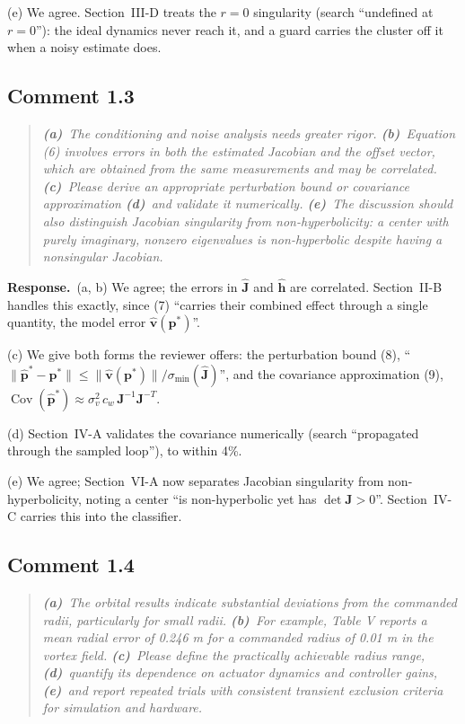 \documentclass[10pt]{article}
\newcommand{\rev}[1]{#1}                             %
\newcommand{\resp}{\par\textbf{Response.}~}
\begin{document}
(e) We agree. Section~III-D treats the $r = 0$ singularity (search ``undefined at $r = 0$''): the ideal dynamics never reach it, and a guard carries the cluster off it when a noisy estimate does.

\subsection*{Comment 1.3}

\begin{quote}\itshape
\textbf{(a)}~The conditioning and noise analysis needs greater rigor.
\textbf{(b)}~Equation (6) involves errors in both the estimated Jacobian and the offset vector, which are obtained from the same measurements and may be correlated.
\textbf{(c)}~Please derive an appropriate perturbation bound or covariance approximation
\textbf{(d)}~and validate it numerically.
\textbf{(e)}~The discussion should also distinguish Jacobian singularity from non-hyperbolicity: a center with purely imaginary, nonzero eigenvalues is non-hyperbolic despite having a nonsingular Jacobian.
\end{quote}

\resp (a, b) We agree; the errors in $\hat{\mathbf{J}}$ and $\hat{\mathbf{h}}$ are correlated. Section~II-B handles this exactly, since (7) ``carries their combined effect through a single quantity, the model error $\hat{\mathbf{v}}(\mathbf{p}^*)$''.

(c) We give both forms the reviewer offers: the perturbation bound (8), ``$\|\hat{\mathbf{p}}^* - \mathbf{p}^*\| \le \|\hat{\mathbf{v}}(\mathbf{p}^*)\|/\sigma_{\min}(\hat{\mathbf{J}})$'', and the covariance approximation (9), $\operatorname{Cov}(\hat{\mathbf{p}}^*) \approx \sigma_v^2\, c_w\, \mathbf{J}^{-1}\mathbf{J}^{-T}$.

(d) Section~IV-A validates the covariance numerically (search ``propagated through the sampled loop''), to within \rev{4}\%.

(e) We agree; Section~VI-A now separates Jacobian singularity from non-hyperbolicity, noting a center ``is non-hyperbolic yet has $\det\mathbf{J} > 0$''. Section~IV-C carries this into the classifier.

\subsection*{Comment 1.4}

\begin{quote}\itshape
\textbf{(a)}~The orbital results indicate substantial deviations from the commanded radii, particularly for small radii.
\textbf{(b)}~For example, Table V reports a mean radial error of 0.246 m for a commanded radius of 0.01 m in the vortex field.
\textbf{(c)}~Please define the practically achievable radius range,
\textbf{(d)}~quantify its dependence on actuator dynamics and controller gains,
\textbf{(e)}~and report repeated trials with consistent transient exclusion criteria for simulation and hardware.
\end{quote}
\end{document}
